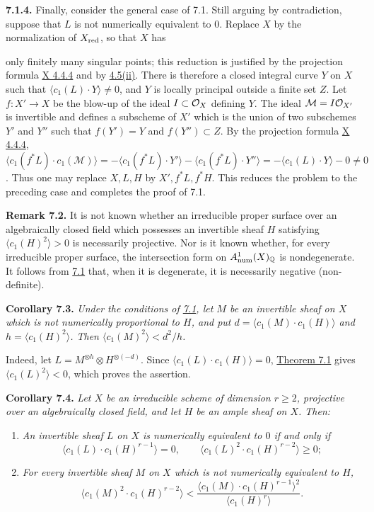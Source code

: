 \textbf{7.1.4.} Finally, consider the general case of 7.1. Still arguing by contradiction, suppose that $L$ is not numerically equivalent to $0$. Replace $X$ by the normalization of $X_{\mathrm{red}}$, so that $X$ has

only finitely many singular points; this reduction is justified by the projection formula \hyperlink{sga6.e10.eq.4-4-4}{X 4.4.4} and by \hyperlink{sga6.e13.prop.4-5}{4.5(ii)}. There is therefore a closed integral curve $Y$ on $X$ such that
$\langle c_1(L)\cdot Y\rangle\ne0$, and $Y$ is locally principal
outside a finite set $Z$. Let $f:X'\to X$ be the blow-up of the ideal
$I\subset\mathcal O_X$ defining $Y$. The ideal $\mathcal M=I\mathcal O_{X'}$ is
invertible and defines a subscheme of $X'$ which is the union of two
subschemes $Y'$ and $Y''$ such that $f(Y')=Y$ and $f(Y'')\subset Z$.
By the projection formula \hyperlink{sga6.e10.eq.4-4-4}{X 4.4.4},
$\langle c_1(f^*L)\cdot c_1(\mathcal M)\rangle
=-\langle c_1(f^*L)\cdot Y'\rangle
-\langle c_1(f^*L)\cdot Y''\rangle
=-\langle c_1(L)\cdot Y\rangle-0\ne0$. Thus one may replace $X,L,H$
by $X',f^*L,f^*H$. This reduces the problem to the preceding case and
completes the proof of 7.1.

\textbf{Remark 7.2.} It is not known whether an irreducible proper surface over an algebraically closed field which possesses an invertible sheaf $H$ satisfying $\langle c_1(H)^2\rangle>0$ is necessarily projective. Nor is it known whether, for every irreducible proper surface, the intersection form on $A^1_{\mathrm{num}}(X)_{\mathbb Q}$ is nondegenerate. It follows from \hyperlink{sga6.e13.thm.7-1}{7.1} that, when it is degenerate, it is necessarily negative (non-definite).

\textbf{Corollary 7.3.} \emph{Under the conditions of \hyperlink{sga6.e13.thm.7-1}{7.1}, let $M$ be
an invertible sheaf on $X$ which is not numerically proportional to $H$,
and put $d=\langle c_1(M)\cdot c_1(H)\rangle$ and
$h=\langle c_1(H)^2\rangle$. Then
$\langle c_1(M)^2\rangle<d^2/h$.}

Indeed, let $L=M^{\otimes h}\otimes H^{\otimes(-d)}$. Since
$\langle c_1(L)\cdot c_1(H)\rangle=0$, \hyperlink{sga6.e13.thm.7-1}{Theorem 7.1} gives
$\langle c_1(L)^2\rangle<0$, which proves the assertion.

\textbf{Corollary 7.4.} \emph{Let $X$ be an irreducible scheme of
dimension $r\geq2$, projective over an algebraically closed field, and
let $H$ be an ample sheaf on $X$. Then:}
\begin{enumerate}[label=(\roman*)]
\item \emph{An invertible sheaf $L$ on $X$ is numerically equivalent to
$0$ if and only if}
\[
  \langle c_1(L)\cdot c_1(H)^{r-1}\rangle=0,
  \qquad
  \langle c_1(L)^2\cdot c_1(H)^{r-2}\rangle\geq0;
\]
\item \emph{For every invertible sheaf $M$ on $X$ which is not
numerically equivalent to $H$,}
\[
  \langle c_1(M)^2\cdot c_1(H)^{r-2}\rangle
  <\frac{\langle c_1(M)\cdot c_1(H)^{r-1}\rangle^2}
  {\langle c_1(H)^r\rangle}.
\]
\end{enumerate}

